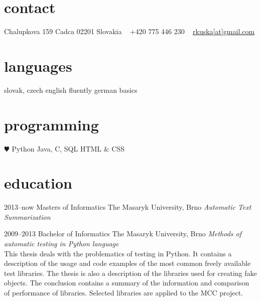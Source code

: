 \documentclass[]{friggeri-cv} %
\begin{document}


\begin{aside} %
\section{contact}
Chalupkova 159
Cadca 02201
Slovakia
~
+420 775 446 230
~
\href{mailto:rkuska@gmail.com}{rkuska[at]gmail.com}
\section{languages}
slovak, czech
english fluently
german basics 
\section{programming}
{\color{red} $\varheartsuit$} Python
Java, C, SQL
HTML \& CSS
\end{aside}


\section{education}

\begin{entrylist}


\entry
{2013--now}
{Masters {\normalfont of Informatics}}
{The Masaryk University, Brno}
{\emph{Automatic Text Summarization}}



\entry
{2009--2013}
{Bachelor {\normalfont of Informatics}}
{The Masaryk University, Brno}
{\emph{Methods of automatic testing in Python language} \\ This thesis deals with the problematics of testing in Python. It contains a description of the usage and code examples of the most common freely available test libraries. The thesis is also a description of the libraries used for creating fake objects. The conclusion contains a summary of the information and comparison of performance of libraries. Selected libraries are applied to the MCC project.}



\end{entrylist}
\end{document}
